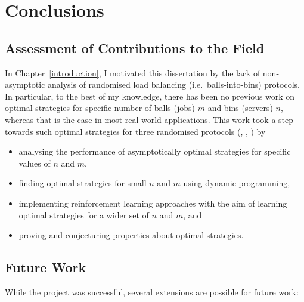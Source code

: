 
\chapter{Conclusions}\label{conclusion}

\ifpdf
    \graphicspath{{Chapter3/Figs/Raster/}{Chapter3/Figs/PDF/}{Chapter3/Figs/}}
\else
    \graphicspath{{Chapter3/Figs/Vector/}{Chapter3/Figs/}}
\fi


\section{Assessment of Contributions to the Field}

In Chapter~\ref{introduction}, I motivated this dissertation by the lack of non-asymptotic analysis of randomised load balancing (i.e.\ balls-into-bins) protocols. In particular, to the best of my knowledge, there has been no previous work on optimal strategies for specific number of balls (jobs) $m$ and bins (servers) $n$, whereas that is the case in most real-world applications. This work took a step towards such optimal strategies for three randomised protocols (\TwoThinning, \KThinning, \GraphicalTwoChoice) by

\begin{itemize}
    \item analysing the performance of asymptotically optimal strategies for specific values of $n$ and $m$,
    \item finding optimal strategies for small $n$ and $m$ using dynamic programming,
    \item implementing reinforcement learning approaches with the aim of learning optimal strategies for a wider set of $n$ and $m$, and
    \item proving and conjecturing properties about optimal strategies.
\end{itemize}



\section{Future Work}

While the project was successful, several extensions are possible for future work:

